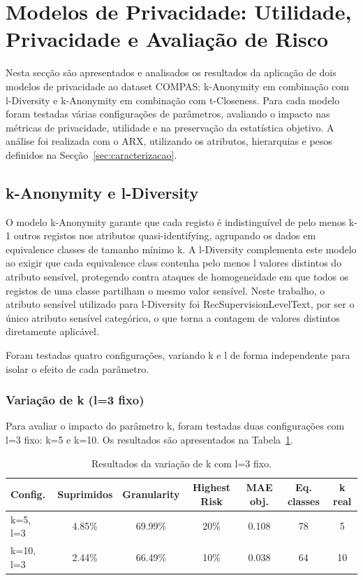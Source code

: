 \section{Modelos de Privacidade: Utilidade, Privacidade e Avaliação de Risco}
\label{sec:modelos}

Nesta secção são apresentados e analisados os resultados da aplicação de dois modelos de privacidade ao dataset COMPAS: k-Anonymity em combinação com l-Diversity e k-Anonymity em combinação com t-Closeness. Para cada modelo foram testadas várias configurações de parâmetros, avaliando o impacto nas métricas de privacidade, utilidade e na preservação da estatística objetivo. A análise foi realizada com o ARX, utilizando os atributos, hierarquias e pesos definidos na Secção~\ref{sec:caracterizacao}.

\subsection{k-Anonymity e l-Diversity}
\label{sec:ldiversity}

O modelo k-Anonymity garante que cada registo é indistinguível de pelo menos k-1 outros registos nos atributos quasi-identifying, agrupando os dados em equivalence classes de tamanho mínimo k. A l-Diversity complementa este modelo ao exigir que cada equivalence class contenha pelo menos l valores distintos do atributo sensível, protegendo contra ataques de homogeneidade em que todos os registos de uma classe partilham o mesmo valor sensível. Neste trabalho, o atributo sensível utilizado para l-Diversity foi RecSupervisionLevelText, por ser o único atributo sensível categórico, o que torna a contagem de valores distintos diretamente aplicável.

Foram testadas quatro configurações, variando k e l de forma independente para isolar o efeito de cada parâmetro.

\subsubsection{Variação de k (l=3 fixo)}

Para avaliar o impacto do parâmetro k, foram testadas duas configurações com l=3 fixo: k=5 e k=10. Os resultados são apresentados na Tabela~\ref{tab:variacao_k}.

\begin{table}[H]
\centering
\caption{Resultados da variação de k com l=3 fixo.}
\label{tab:variacao_k}
\begin{tabular}{lcccccc}
\toprule
\textbf{Config.} & \textbf{Suprimidos} & \textbf{Granularity} & \textbf{Highest Risk} & \textbf{MAE obj.} & \textbf{Eq. classes} & \textbf{k real} \\
\midrule
k=5, l=3 & 4.85\% & 69.99\% & 20\% & 0.108 & 78 & 5 \\
k=10, l=3 & 2.44\% & 66.49\% & 10\% & 0.038 & 64 & 10 \\
\bottomrule
\end{tabular}
\end{table}

